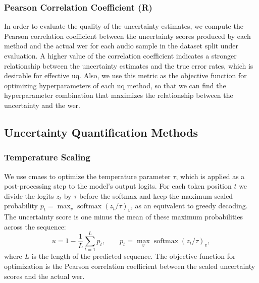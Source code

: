 \subsubsection{Pearson Correlation Coefficient (R)}
In order to evaluate the quality of the uncertainty estimates, we compute the Pearson correlation coefficient between the uncertainty scores produced by each method and the actual \acrshort{wer} for each audio sample in the dataset split under evaluation. A higher value of the correlation coefficient indicates a stronger relationship between the uncertainty estimates and the true error rates, which is desirable for effective \acrshort{uq}.
Also, we use this metric as the objective function for optimizing hyperparameters of each \acrshort{uq} method, so that we can find the hyperparameter combination that maximizes the relationship between the uncertainty and the \acrshort{wer}.

\subsection{Uncertainty Quantification Methods}

\subsubsection{Temperature Scaling}
We use \acrshort{cmaes} to optimize the temperature parameter $\tau$, which is applied as a post-processing step to the model's output logits. For each token position $t$ we divide the logits $z_t$ by $\tau$ before the softmax and keep the maximum scaled probability $p_t = \max_v \operatorname{softmax}(z_t / \tau)_v$, as an equivalent to greedy decoding. The uncertainty score is one minus the mean of these maximum probabilities across the sequence:
\begin{equation}
	u = 1 - \frac{1}{L}\sum_{t=1}^{L} p_t,
	\qquad p_t = \max_v \operatorname{softmax}(z_t / \tau)_v,
\end{equation}
where $L$ is the length of the predicted sequence. The objective function for optimization is the Pearson correlation coefficient between the scaled uncertainty scores and the actual \acrshort{wer}.

